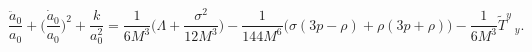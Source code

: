 \begin{equation}
\label{1eq10}
 \frac{\ddot a_0}{a_0} + \Big( \frac{\dot a_0}{a_0} \Big )^2 +
 \frac{k}{a_0^2} =\frac{1}{6M^3} \Big( \Lambda + \frac{\sigma^2}{12 M^3}
 \Big) -\frac{1}{144M^6}\Big(\sigma(3p -\rho)+\rho(3p+\rho)\Big)-
 \frac{1}{6M^3} \tilde T^y~_y.
  \end{equation}

